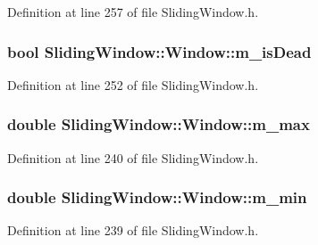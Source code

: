 Definition at line 257 of file Sliding\+Window.\+h.

\subsubsection[{\texorpdfstring{m\+\_\+is\+Dead}{m_isDead}}]{\setlength{\rightskip}{0pt plus 5cm}bool Sliding\+Window\+::\+Window\+::m\+\_\+is\+Dead\hspace{0.3cm}{\ttfamily [protected]}}\hypertarget{classSlidingWindow_1_1Window_a760dc31d2bafceaabcb58261d0766d63}{}\label{classSlidingWindow_1_1Window_a760dc31d2bafceaabcb58261d0766d63}


Definition at line 252 of file Sliding\+Window.\+h.

\subsubsection[{\texorpdfstring{m\+\_\+max}{m_max}}]{\setlength{\rightskip}{0pt plus 5cm}double Sliding\+Window\+::\+Window\+::m\+\_\+max\hspace{0.3cm}{\ttfamily [protected]}}\hypertarget{classSlidingWindow_1_1Window_a8432b5cb2b2905277fce6156bbea4884}{}\label{classSlidingWindow_1_1Window_a8432b5cb2b2905277fce6156bbea4884}


Definition at line 240 of file Sliding\+Window.\+h.

\subsubsection[{\texorpdfstring{m\+\_\+min}{m_min}}]{\setlength{\rightskip}{0pt plus 5cm}double Sliding\+Window\+::\+Window\+::m\+\_\+min\hspace{0.3cm}{\ttfamily [protected]}}\hypertarget{classSlidingWindow_1_1Window_a76de5f0c8ec2471d87122221bd8704fe}{}\label{classSlidingWindow_1_1Window_a76de5f0c8ec2471d87122221bd8704fe}


Definition at line 239 of file Sliding\+Window.\+h.

